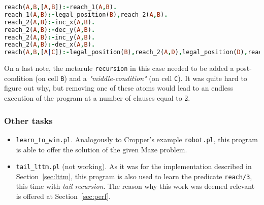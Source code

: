 \begin{lstlisting}[label={lst:res_rfsm},language=Prolog, caption=Result of \texttt{reach\_from\_scratch\_memory.pl}, belowcaptionskip=1cm]
reach(A,B,[A,B]):-reach_1(A,B).
reach_1(A,B):-legal_position(B),reach_2(A,B).
reach_2(A,B):-inc_x(A,B).
reach_2(A,B):-dec_y(A,B).
reach_2(A,B):-inc_y(A,B).
reach_2(A,B):-dec_x(A,B).
reach(A,B,[A|C]):-legal_position(B),reach_2(A,D),legal_position(D),reach(D,B,C).
\end{lstlisting}
On a last note, the metarule \texttt{recursion} in this case needed to be added a post-condition (on cell \texttt{B}) and a \emph{"middle-condition"}
(on cell \texttt{C}). It was quite hard to figure out why, but removing one of these atoms would lead to an endless execution of the program at a
number of clauses equal to 2.

\subsubsection{Other tasks}
\begin{itemize}
    \item \texttt{learn\_to\_win.pl}. Analogously to Cropper's example \texttt{robot.pl}, this program is able to offer the solution of the given Maze problem.
    \item \texttt{tail\_lttm.pl} (not working). As it was for the implementation described in Section~\ref{sec:lttm}, this program is also used to learn the predicate \texttt{reach/3}, this time with \emph{tail recursion}. The reason why this work was deemed relevant is offered at Section~\ref{sec:perf}.
\end{itemize}
\newpage